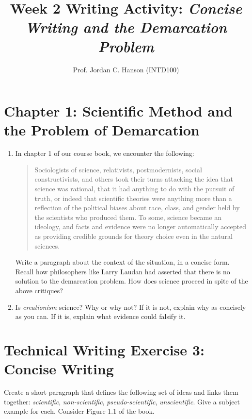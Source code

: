 \documentclass{article}
\begin{document}
\title{Week 2 Writing Activity: \textit{Concise Writing and the Demarcation Problem}}
\author{Prof. Jordan C. Hanson (INTD100)}

\maketitle

\section{Chapter 1: Scientific Method and the Problem of Demarcation}

\begin{enumerate}
\item In chapter 1 of our course book, we encounter the following:
\begin{quotation}
Sociologists of science, relativists, postmodernists, social constructivists, and others took their turns attacking the idea that science was rational, that it had anything to do with the pursuit of truth, or indeed that scientific theories were anything more than a reflection of the political biases about race, class, and gender held by the scientists who produced them. To some, science became an ideology, and facts and evidence were no longer automatically accepted as providing credible grounds for theory choice even in the natural sciences.
\end{quotation}
Write a paragraph about the context of the situation, in a concise form.  Recall how philosophers like Larry Laudan had asserted that there is no solution to the demarcation problem.  How does science proceed in spite of the above critiques? \\ \vspace{3cm}
\item Is \textit{creationism} science?  Why or why not?  If it is not, explain why as concisely as you can.  If it is, explain what evidence could falsify it.
\\
\vspace{2cm}
\end{enumerate}

\section{Technical Writing Exercise 3: Concise Writing}

Create a short paragraph that defines the following set of ideas and links them together: \textit{scientific}, \textit{non-scientific}, \textit{pseudo-scientific}, \textit{unscientific}.  Give a subject example for each.  Consider Figure 1.1 of the book.
\end{document}
